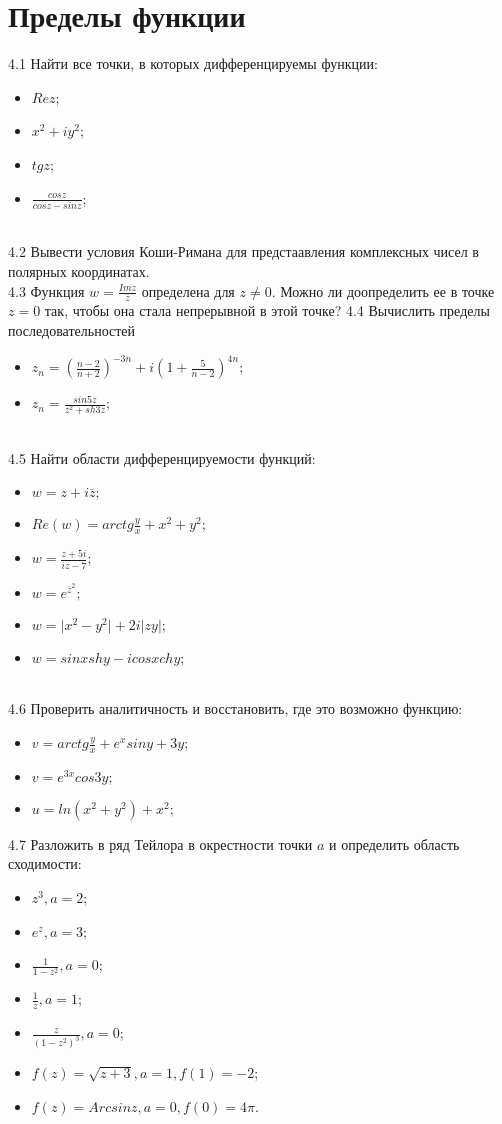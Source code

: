 \documentclass{article}
\begin{document}
\section{Пределы функции}
4.1 Найти все точки, в которых дифференцируемы функции:\begin{itemize}
\item $Re z$;
\item $x^2+iy^2$;
\item $tg z$;
\item $\frac{cos z}{cos z - sin z}$;
\end{itemize}\\
4.2 Вывести условия Коши-Римана для предстаавления комплексных чисел в  полярных координатах. \\
4.3 Функция $w = \frac{Im z}{\overline{z}}$ определена для $z \neq 0$. Можно ли доопределить ее в точке $z = 0$ так, чтобы она стала непрерывной в этой точке? %
4.4 Вычислить пределы последовательностей
\begin{itemize}
\item $z_n = (\frac{n-2}{n+2})^{-3n} + i(1+\frac{5}{n-2})^{4n};$
\item $z_n=\frac{sin{5z}}{z^2+sh{3z}};$
\end{itemize}
\\
4.5 Найти области дифференцируемости функций:
\begin{itemize}
\item $w=z+i\overline{z};$
\item $Re(w) = arctg \frac{y}{x} + x^2 + y^2;$
\item $w=\frac{z+5i}{iz-7};$
\item $w=e^\overline{z}^2;$
\item $w=\vert x^2 - y^2 \vert +2i\vert zy \vert;$
\item $w=sin{x}sh{y} -i cos{x}ch{y};$
\end{itemize}\\
4.6 Проверить аналитичность и восстановить, где это возможно функцию:
\begin{itemize}
\item $v = arctg \frac{y}{x} +e^xsin{y}+3y;$
\item $v=e^{3x}cos{3y};$
\item $u=ln(x^2+y^2)+x^2;$
\end{itemize}
4.7 Разложить в ряд Тейлора в окрестности точки $a$ и определить область сходимости:
\begin{itemize}
\item $z^3, a=2$;
\item $e^z, a=3$;
\item $\frac{1}{1-z^2}, a=0$;
\item $\frac{1}{z}, a=1$;
\item $\frac{z}{(1-z^2)^3}, a=0$;
\item $f(z)=\sqrt{z+3}, a=1,f(1)=-2$;
\item $f(z)=Arcsinz,a=0, f(0)=4\pi$.
\end{itemize}\\
\end{document}
